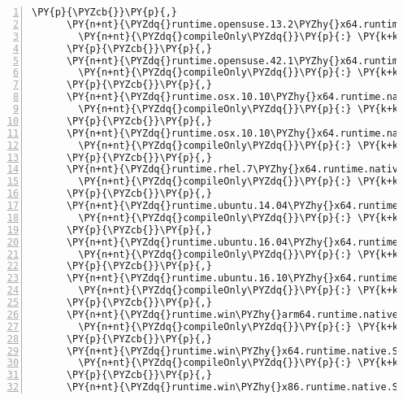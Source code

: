 \begin{Verbatim}[commandchars=\\\{\},numbers=left,firstnumber=1,stepnumber=1,numberblanklines=0]
      \PY{p}{\PYZcb{}}\PY{p}{,}
      \PY{n+nt}{\PYZdq{}runtime.opensuse.13.2\PYZhy{}x64.runtime.native.System.Security.Cryptography.OpenSsl/4.3.0\PYZdq{}}\PY{p}{:} \PY{p}{\PYZob{}}
        \PY{n+nt}{\PYZdq{}compileOnly\PYZdq{}}\PY{p}{:} \PY{k+kc}{true}
      \PY{p}{\PYZcb{}}\PY{p}{,}
      \PY{n+nt}{\PYZdq{}runtime.opensuse.42.1\PYZhy{}x64.runtime.native.System.Security.Cryptography.OpenSsl/4.3.0\PYZdq{}}\PY{p}{:} \PY{p}{\PYZob{}}
        \PY{n+nt}{\PYZdq{}compileOnly\PYZdq{}}\PY{p}{:} \PY{k+kc}{true}
      \PY{p}{\PYZcb{}}\PY{p}{,}
      \PY{n+nt}{\PYZdq{}runtime.osx.10.10\PYZhy{}x64.runtime.native.System.Security.Cryptography.Apple/4.3.0\PYZdq{}}\PY{p}{:} \PY{p}{\PYZob{}}
        \PY{n+nt}{\PYZdq{}compileOnly\PYZdq{}}\PY{p}{:} \PY{k+kc}{true}
      \PY{p}{\PYZcb{}}\PY{p}{,}
      \PY{n+nt}{\PYZdq{}runtime.osx.10.10\PYZhy{}x64.runtime.native.System.Security.Cryptography.OpenSsl/4.3.0\PYZdq{}}\PY{p}{:} \PY{p}{\PYZob{}}
        \PY{n+nt}{\PYZdq{}compileOnly\PYZdq{}}\PY{p}{:} \PY{k+kc}{true}
      \PY{p}{\PYZcb{}}\PY{p}{,}
      \PY{n+nt}{\PYZdq{}runtime.rhel.7\PYZhy{}x64.runtime.native.System.Security.Cryptography.OpenSsl/4.3.0\PYZdq{}}\PY{p}{:} \PY{p}{\PYZob{}}
        \PY{n+nt}{\PYZdq{}compileOnly\PYZdq{}}\PY{p}{:} \PY{k+kc}{true}
      \PY{p}{\PYZcb{}}\PY{p}{,}
      \PY{n+nt}{\PYZdq{}runtime.ubuntu.14.04\PYZhy{}x64.runtime.native.System.Security.Cryptography.OpenSsl/4.3.0\PYZdq{}}\PY{p}{:} \PY{p}{\PYZob{}}
        \PY{n+nt}{\PYZdq{}compileOnly\PYZdq{}}\PY{p}{:} \PY{k+kc}{true}
      \PY{p}{\PYZcb{}}\PY{p}{,}
      \PY{n+nt}{\PYZdq{}runtime.ubuntu.16.04\PYZhy{}x64.runtime.native.System.Security.Cryptography.OpenSsl/4.3.0\PYZdq{}}\PY{p}{:} \PY{p}{\PYZob{}}
        \PY{n+nt}{\PYZdq{}compileOnly\PYZdq{}}\PY{p}{:} \PY{k+kc}{true}
      \PY{p}{\PYZcb{}}\PY{p}{,}
      \PY{n+nt}{\PYZdq{}runtime.ubuntu.16.10\PYZhy{}x64.runtime.native.System.Security.Cryptography.OpenSsl/4.3.0\PYZdq{}}\PY{p}{:} \PY{p}{\PYZob{}}
        \PY{n+nt}{\PYZdq{}compileOnly\PYZdq{}}\PY{p}{:} \PY{k+kc}{true}
      \PY{p}{\PYZcb{}}\PY{p}{,}
      \PY{n+nt}{\PYZdq{}runtime.win\PYZhy{}arm64.runtime.native.System.Data.SqlClient.sni/4.4.0\PYZdq{}}\PY{p}{:} \PY{p}{\PYZob{}}
        \PY{n+nt}{\PYZdq{}compileOnly\PYZdq{}}\PY{p}{:} \PY{k+kc}{true}
      \PY{p}{\PYZcb{}}\PY{p}{,}
      \PY{n+nt}{\PYZdq{}runtime.win\PYZhy{}x64.runtime.native.System.Data.SqlClient.sni/4.4.0\PYZdq{}}\PY{p}{:} \PY{p}{\PYZob{}}
        \PY{n+nt}{\PYZdq{}compileOnly\PYZdq{}}\PY{p}{:} \PY{k+kc}{true}
      \PY{p}{\PYZcb{}}\PY{p}{,}
      \PY{n+nt}{\PYZdq{}runtime.win\PYZhy{}x86.runtime.native.System.Data.SqlClient.sni/4.4.0\PYZdq{}}\PY{p}{:} \PY{p}{\PYZob{}}

\end{Verbatim}
